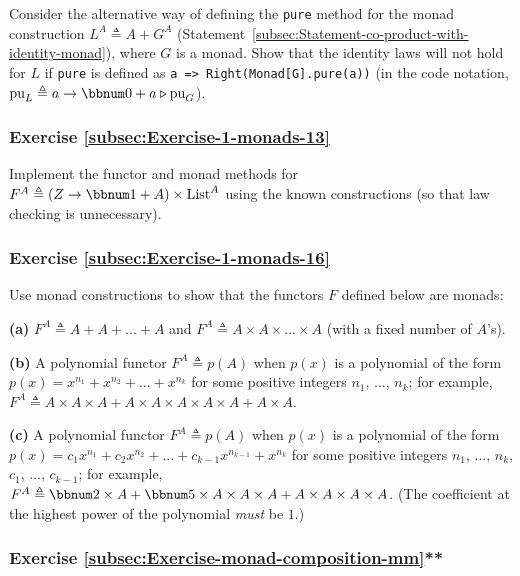 Consider the alternative way of defining the \lstinline!pure! method
for the monad construction $L^{A}\triangleq A+G^{A}$ (Statement~\ref{subsec:Statement-co-product-with-identity-monad}),
where $G$ is a monad. Show that the identity laws will not hold for
$L$ if \lstinline!pure! is defined as \lstinline!a => Right(Monad[G].pure(a))!
(in the code notation, $\text{pu}_{L}\triangleq a\rightarrow\bbnum 0+a\triangleright\text{pu}_{G}$).

\subsubsection{Exercise \label{subsec:Exercise-1-monads-13}\ref{subsec:Exercise-1-monads-13}}

Implement the functor and monad methods for $F^{A}\triangleq\left(Z\rightarrow\bbnum 1+A\right)\times\text{List}^{A}$
using the known constructions (so that law checking is unnecessary).

\subsubsection{Exercise \label{subsec:Exercise-1-monads-16}\ref{subsec:Exercise-1-monads-16}}

Use monad constructions to show that the functors $F$ defined below
are monads:

\textbf{(a)} $F^{A}\triangleq A+A+...+A$ and $F^{A}\triangleq A\times A\times...\times A$
(with a fixed number of $A$\textsf{'}s).

\textbf{(b)} A polynomial functor $F^{A}\triangleq p(A)$ when $p(x)$
is a polynomial of the form $p(x)=x^{n_{1}}+x^{n_{2}}+...+x^{n_{k}}$
for some positive integers $n_{1}$, ..., $n_{k}$; for example, $F^{A}\triangleq A\times A\times A+A\times A\times A\times A\times A+A\times A$. 

\textbf{(c)} A polynomial functor $F^{A}\triangleq p(A)$ when $p(x)$
is a polynomial of the form $p(x)=c_{1}x^{n_{1}}+c_{2}x^{n_{2}}+...+c_{k-1}x^{n_{k-1}}+x^{n_{k}}$
for some positive integers $n_{1}$, ..., $n_{k}$, $c_{1}$, ...,
$c_{k-1}$; for example, $F^{A}\triangleq\bbnum 2\times A+\bbnum 5\times A\times A\times A+A\times A\times A\times A$.
(The coefficient at the highest power of the polynomial \emph{must}
be $1$.)

\subsubsection{Exercise \label{subsec:Exercise-monad-composition-mm}\ref{subsec:Exercise-monad-composition-mm}{*}{*}}

